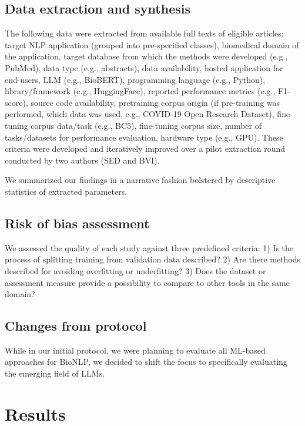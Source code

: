 \documentclass[fleqn,10pt]{olplainarticle}
\begin{document}
\subsection*{Data extraction and synthesis}
The following data were extracted from available full texts of eligible articles: target NLP application (grouped into pre-specified classes), biomedical domain of the application, target database from which the methods were developed (e.g., PubMed), data type (e.g., abstracts), data availability, hosted application for end-users, LLM (e.g., BioBERT), programming language (e.g., Python), library/framework (e.g., HuggingFace), reported performance metrics (e.g., F1-score), source code availability, pretraining corpus origin (if pre-training was performed, which data was used, e.g., COVID-19 Open Research Dataset), fine-tuning corpus data/task (e.g., BC5), fine-tuning corpus size, number of tasks/datasets for performance evaluation, hardware type (e.g., GPU). These criteria were developed and iteratively improved over a pilot extraction round conducted by two authors (SED and BVI). %

We summarized our findings in a narrative fashion bolstered by descriptive statistics of extracted parameters.


\subsection*{Risk of bias assessment}
We assessed the quality of each study against three predefined criteria: 1) Is the process of splitting training from validation data described? 2) Are there methods described for avoiding overfitting or underfitting?  3) Does the dataset or assessment measure provide a possibility to compare to other tools in the same domain?

\subsection*{Changes from protocol}
While in our initial protocol, we were planning to evaluate all ML-based approaches for BioNLP, we decided to shift the focus to specifically evaluating the emerging field of LLMs. 

\section*{Results}
\label{sec:results}
\end{document}
